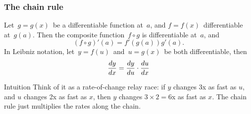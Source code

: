 







 \begin{frame}[fragile] \frametitle{The chain rule}
Let\ $g=g(x)$\ be a differentiable function at\ $a$, and $f=f(x)$\ differentiable at\ $g(a)$. Then the composite function\ $f\circ g$ is differentiable at\ $a$, and
{\[ (f\circ g)'(a) = f'(g(a)) g'(a) .\]}
In Leibniz notation, let\ $y=f(u)$\ and\ $u=g(x)$\ be both differentiable, then
{\[\frac{d {y} }{d x} = \frac{d y}{d u} \cdot \frac{d {u} }{d x} \]}

\begin{block}{Intuition}
Think of it as a rate-of-change relay race: if $y$ changes 3x as fast as $u$, and $u$ changes 2x as fast as $x$, then $y$ changes $3 \times 2 = 6$x as fast as $x$. The chain rule just multiplies the rates along the chain.
\end{block}
\end{frame}

